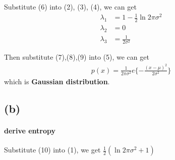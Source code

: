 \documentclass[]{article}
\begin{document}
						
						Substitute (6) into (2), (3), (4), we can get 
						\begin{align}
						\lambda_{1} &= 1 - \frac{1}{2} \ln{2\pi \sigma^{2}}\\
						\lambda_{2} &= 0\\
						\lambda_{3} &= \frac{1}{2\sigma^{2}}  
						\end{align}
						
						Then substitute (7),(8),(9) into (5), we can get
						\begin{align}
						p(x) = \frac{1}{2\pi\sigma^{2}}e\lbrace-\frac{(x-\mu)^{2}}{2\sigma^{2}}\rbrace
						\end{align}
						which is \textbf{Gaussian distribution}.
		\subsection*{(b)}
				\paragraph*{derive entropy}
				Substitute (10) into (1), we get $\frac{1}{2}(\ln{2\pi\sigma^{2}}+1)$
						
						
\end{document}
